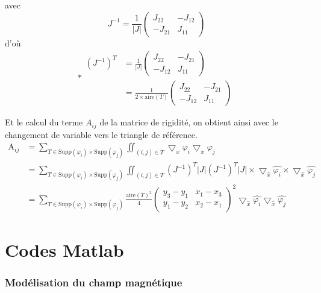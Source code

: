 \documentclass[a4paper,12pt,titlepage]{report}
\begin{document}
\begin{onehalfspace}
\begin{appendix}
avec
\[
J^{-1} =  \frac{1}{|J|}
\begin{pmatrix}
   J_{22} & -J_{12} \\
   -J_{21} & J_{11}
\end{pmatrix}
\]
d'où
\[
*\begin{aligned}
	(J^{-1})^{T} 
	&=  	
	\frac{1}{|J|}
	\begin{pmatrix}
   		J_{22} & -J_{21} \\
   		-J_{12} & J_{11}	
	\end{pmatrix} \\
	&=
	\frac{1}{2\times \text{aire}(T)}
	\begin{pmatrix}
   		J_{22} & -J_{21} \\
   		-J_{12} & J_{11}	
	\end{pmatrix} 
	\end{aligned}
\]

Et le calcul du terme $A_{ij}$ de la matrice de rigidité, on obtient ainsi avec le changement de variable vers le triangle de référence.
\[
\begin{aligned}
	\text{A}_{ij} 
	&=
	\sum_{T \in \text{Supp}(\varphi_{i})\times \text{Supp}(\varphi_{j})} 
	\iint_{(i,j) \in T}\bigtriangledown_{x}{\varphi_{i}} \bigtriangledown_{x}{\varphi_{j}} \\
	&=
	\sum_{T \in \text{Supp}(\varphi_{i})\times \text{Supp}(\varphi_{j})}
	\iint_{(i,j) \in T} (J^{-1})^{T}|J|(J^{-1})^{T}|J|
	\times
	\bigtriangledown_{\hat{x}} \hat{\varphi_{i}}
	\times
	\bigtriangledown_{\hat{x}} \hat{\varphi_{j}} \\
	&=
	\sum_{T \in \text{Supp}(\varphi_{i})\times \text{Supp}(\varphi_{j})}	
	\frac{\text{aire}(T)^{2}}{4}
	\begin{pmatrix}
   		y_{3}-y_{1} &  	x_{1}-x_{3}\\
   		y_{1}-y_{2} &  x_{2}-x_{1}
	\end{pmatrix}
	^{2}
	\bigtriangledown_{\hat{x}} \hat{\varphi_{i}}
	\bigtriangledown_{\hat{x}} \hat{\varphi_{j}}
\end{aligned}
\]


\chapter{Codes Matlab}
\label{annexe_2}

\subsection{Modélisation du champ magnétique}










\end{appendix}
\end{onehalfspace}
\end{document}
